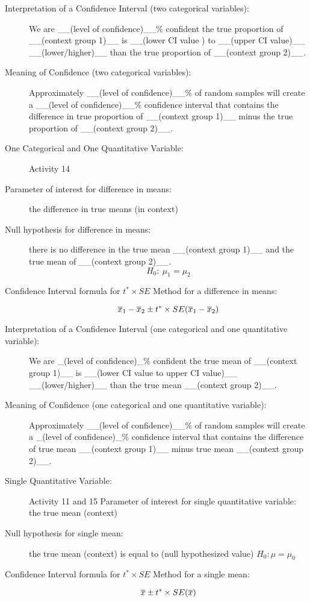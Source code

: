 \begin{description}
  \item [Interpretation of a Confidence Interval (two categorical variables):]
  We are \_\_(level of confidence)\_\_\%  confident the true
  proportion of \_\_(context group 1)\_\_ is \_\_(lower CI value )  to
  \_\_(upper CI value)\_\_  \_\_(lower/higher)\_\_ than the true
  proportion of \_\_(context group 2)\_\_.
  \item [Meaning of Confidence (two categorical variables):]
       Approximately \_\_(level of confidence)\_\_\% of random samples
       will create a \_\_(level of confidence)\_\_\% confidence
       interval that contains the difference in true proportion of
       \_\_(context group 1)\_\_ minus the true proportion of \_\_(context
       group 2)\_\_.
     \item [One Categorical and One Quantitative Variable:] Activity
       14
     \item [Parameter of interest for difference in means:] the
       difference in true means (in context)
     \item [Null hypothesis for difference in means:] there is no
       difference in the true mean  \_\_(context group 1)\_\_  and the true
       mean of   \_\_(context group 2)\_\_.
                   $$H_0:\  \mu_1 = \mu_2$$
     \item [Confidence Interval formula for $t^* \times SE$ Method for
       a difference in means:] $$ \overline{x}_1 -\overline{x}_2 \pm t^* \times
       SE(\overline{x}_1 - \overline{x}_2) $$ 
     \item [Interpretation of a Confidence Interval (one categorical
       and one quantitative variable):] 
       We are \_(level of confidence)\_\%  confident the true mean of
       \_\_(context group 1)\_\_ is \_\_(lower CI value to upper CI
       value)\_\_   \_\_(lower/higher)\_\_ than the true mean
       \_\_(context group 2)\_\_. 
     \item [Meaning of Confidence (one categorical and one
       quantitative variable):] 
       Approximately \_\_(level of confidence)\_\_\% of random samples
       will create a \_(level of confidence)\_\% confidence interval
       that  contains the difference of true mean \_\_(context group
       1)\_\_ minus true mean  \_\_(context group 2)\_\_.
     \item [Single Quantitative Variable:] Activity 11 and 15
       Parameter of interest for single quantitative variable: the
       true mean (context)
     \item [Null hypothesis for single mean:] the true mean  (context)
       is equal to  (null hypothesized value) $ H_0: \mu = \mu_0$
     \item [Confidence Interval formula for $t^*\times SE$ Method for
       a single mean:]$$ \overline{x} \pm t^* \times SE(\overline{x}) $$ 


\end{description}
